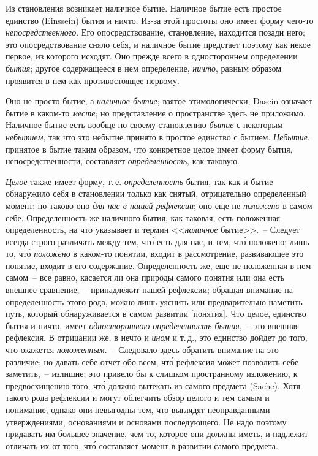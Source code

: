 Из становления возникает наличное бытие. Наличное
бытие есть простое единство (Einssein) бытия и ничто.
Из-за этой простоты оно имеет форму чего-то \emph{непосредственного}.
Его опосредствование, становление, находится
позади него; это опосредствование сняло себя, и наличное
бытие предстает поэтому как некое первое, из которого
исходят. Оно прежде всего в одностороннем определении
\emph{бытия}; другое содержащееся в нем определение,
\emph{ничто}, равным образом проявится в нем как противостоящее
первому.

Оно не просто бытие, а \emph{наличное бытие}; взятое этимологически,
Dasein означает бытие в каком-то \emph{месте}; но
представление о пространстве здесь не приложимо. Наличное
бытие есть вообще по своему становлению \emph{бытие}
с некоторым \emph{небытием}, так что это небытие принято в
простое единство с бытием. \emph{Небытие}, принятое в бытие
таким образом, что конкретное целое имеет форму бытия,
непосредственности, составляет \emph{определенность}, как таковую.

\emph{Целое} также имеет форму, т.\,е. \emph{определенность} бытия,
так как и бытие обнаружило себя в становлении только
как снятый, отрицательно определенный момент\endnotemark{}; но
таково оно \emph{для нас в нашей рефлексии}; оно еще не \emph{положено}
в самом себе. Определенность же наличного бытия,
как таковая, есть положенная определенность, на что
указывает и термин <<\emph{наличное} бытие>>.~-- Следует всегда
строго различать между тем, чт\'о есть для нас, и тем,
чт\'о положено; лишь то, чт\'о \emph{положено} в каком-то понятии,
входит в рассмотрение, развивающее это понятие,
входит в его содержание. Определенность же, еще не положенная
в нем самом~-- все равно, касается ли она
природы самого понятия или она есть внешнее сравнение,~--
принадлежит нашей рефлексии; обращая внимание
на определенность этого рода, можно лишь уяснить
или предварительно наметить путь, который обнаруживается
в самом развитии [понятия]. Что целое, единство
бытия и ничто, имеет \emph{одностороннюю определенность
бытия},~-- это внешняя рефлексия. В отрицании же, в
нечто и \emph{ином} и т.\,д., это единство дойдет до того, что
окажется \emph{положенным}.~-- Следовало здесь обратить внимание
на это различие; но давать себе отчет обо всем,
чт\'о рефлексия может позволить себе заметить,~-- излишне;
это привело бы к слишком пространному изложению,
к предвосхищению того, чт\'о должно вытекать из самого
предмета (Sache). Хотя такого рода рефлексии и могут
облегчить обзор целого и тем самым и понимание, однако
они невыгодны тем, что выглядят неоправданными
утверждениями, основаниями и основами последующего.
Не надо поэтому придавать им большее значение, чем то,
которое они должны иметь, и надлежит отличать их от
того, чт\'о составляет момент в развитии самого предмета.

